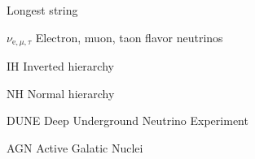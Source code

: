 
\begin{glossary}{Longest  string}
    
    \item[$\nu_{\mathrm e, \mu, \tau}$]
        Electron, muon, taon flavor neutrinos
    \item[IH]
        Inverted hierarchy
    \item[NH]
        Normal hierarchy
    \item[DUNE]
        Deep Underground Neutrino Experiment
    \item[AGN]
        Active Galatic Nuclei
\end{glossary}
